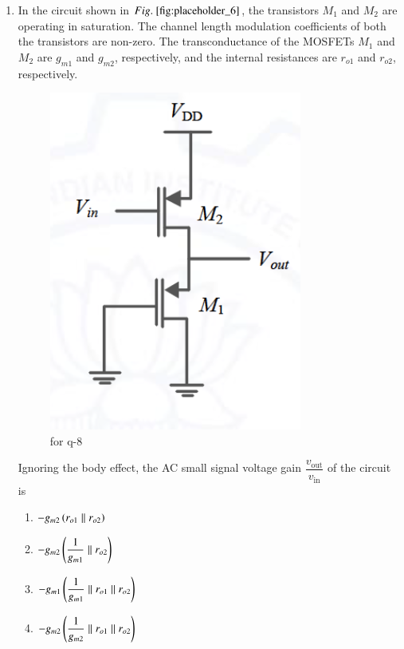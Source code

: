 \documentclass[journal,12pt,onecolumn]{IEEEtran}
\theoremstyle{remark}
\begin{document}
\begin{enumerate}
\item In the circuit shown in $\figref{fig:placeholder_6}$, the transistors $M_1$ and $M_2$ are operating in saturation. The channel length modulation coefficients of both the transistors are non-zero. The transconductance of the MOSFETs $M_1$ and $M_2$ are $g_{m1}$ and $g_{m2}$, respectively, and the internal resistances are $r_{o1}$ and $r_{o2}$, respectively.  
\begin{figure}[H]
    \centering
    \includegraphics[width=0.3\columnwidth]{figs/6.png}
    \caption{\centering for q-8}
    \label{fig:placeholder_6}
\end{figure}
Ignoring the body effect, the AC small signal voltage gain $\dfrac{v_{\text{out}}}{v_{\text{in}}}$ of the circuit is
\begin{multicols}{2}
\begin{enumerate}
\item $-g_{m2} \left(r_{o1} \parallel r_{o2}\right)$
\item $-g_{m2} \left(\dfrac{1}{g_{m1}} \parallel r_{o2}\right)$
\item $-g_{m1} \left(\dfrac{1}{g_{m1}} \parallel r_{o1} \parallel r_{o2}\right)$
\item $-g_{m2} \left(\dfrac{1}{g_{m2}} \parallel r_{o1} \parallel r_{o2}\right)$
\end{enumerate}
\end{multicols}
\hfill {}


\end{enumerate}
\end{document}
